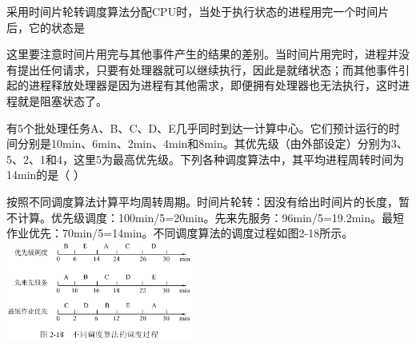 \question 采用时间片轮转调度算法分配CPU时，当处于执行状态的进程用完一个时间片后，它的状态是
\par{}
\begin{solution}这里要注意时间片用完与其他事件产生的结果的差别。当时间片用完时，进程并没有提出任何请求，只要有处理器就可以继续执行，因此是就绪状态；而其他事件引起的进程释放处理器是因为进程有其他需求，即便拥有处理器也无法执行，这时进程就是阻塞状态了。
\end{solution}
\question 有5个批处理任务A、B、C、D、E几乎同时到达一计算中心。它们预计运行的时间分别是10min、6min、2min、4min和8min。其优先级（由外部设定）分别为3、5、2、1和4，这里5为最高优先级。下列各种调度算法中，其平均进程周转时间为14min的是（
）
\par{}
\begin{solution}按照不同调度算法计算平均周转周期。时间片轮转：因没有给出时间片的长度，暂不计算。优先级调度：100min/5=20min。先来先服务：96min/5=19.2min。最短作业优先：70min/5=14min。不同调度算法的调度过程如图2-18所示。
\includegraphics[width=2.42708in,height=1.28125in]{computerassets/D9AA33FBE58C25E01D7F0F0AA85BAC4D.png}
\end{solution}
